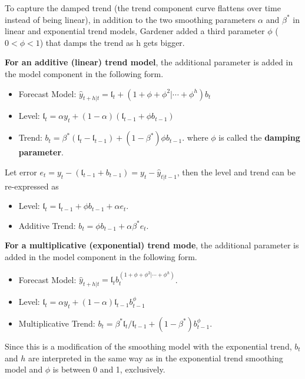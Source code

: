 \documentclass[
]{book}
\begin{document}
To capture the damped trend (the trend component curve flattens over time instead of being linear), in addition to the two smoothing parameters \(\alpha\) and \(\beta^*\) in linear and exponential trend models, Gardener added a third parameter \(\phi\) (\(0< \phi < 1\)) that damps the trend as h gets bigger.

\textbf{For an additive (linear) trend model}, the additional parameter is added in the model component in the following form.

\begin{itemize}
\item
  Forecast Model: \(\hat{y}_{t+h|t} = \mathfrak{l}_t + (1 + \phi+\phi^2|\cdots+\phi^h)b_t\)
\item
  Level: \(\mathfrak{l}_t = \alpha y_t + (1-\alpha)(\mathfrak{l}_{t-1}+\phi b_{t-1})\)
\item
  Trend: \(b_t = \beta^* (\mathfrak{l}_t-\mathfrak{l}_{t-1}) + (1-\beta^*)\phi b_{t-1}\). where \(\phi\) is called the \textbf{damping parameter}.
\end{itemize}

Let error \(e_t = y_t-(\mathfrak{l}_{t-1}+b_{t-1})=y_t-\hat{y}_{t|t-1}\), then the level and trend can be re-expressed as

\begin{itemize}
\item
  Level: \(\mathfrak{l}_t = \mathfrak{l}_{t-1} + \phi b_{t-1} + \alpha e_t\).
\item
  Additive Trend: \(b_t=\phi b_{t-1} + \alpha \beta^* e_t\).
\end{itemize}

\textbf{For a multiplicative (exponential) trend mode}, the additional parameter is added in the model component in the following form.

\begin{itemize}
\item
  Forecast Model: \(\hat{y}_{t+h|t} = \mathfrak{l}_t b_{t}^{(1 + \phi+\phi^2|\cdots+\phi^h)}\).
\item
  Level: \(\mathfrak{l}_t = \alpha y_t + (1-\alpha)\mathfrak{l}_{t-1}b_{t-1}^\phi\)
\item
  Multiplicative Trend: \(b_t=\beta^*\mathfrak{l}_t/\mathfrak{l}_{t-1} + (1-\beta^*) b_{t-1}^\phi\).
\end{itemize}

Since this is a modification of the smoothing model with the exponential trend, \(b_t\) and \(h\) are interpreted in the same way as in the exponential trend smoothing model and \(\phi\) is between 0 and 1, exclusively.
\end{document}
